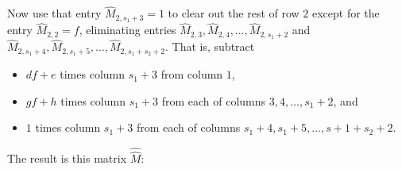 \documentclass[10pt,reqno]{amsart}
\begin{document}
\noindent
Now use that entry $\hat{M}_{2,s_1+3}=1$
to clear out the rest of row $2$ except for the entry $\hat{M}_{2,2}=f$, eliminating entries
$\hat{M}_{2,3},\hat{M}_{2,4},\ldots,\hat{M}_{2,s_1+2}$ and  $\hat{M}_{2,s_1+4},\hat{M}_{2,s_1+5},\ldots,\hat{M}_{2,s_1+s_2+2}$.
That is, subtract 
\begin{itemize}
\item $df+e$ times column $s_1+3$ from column $1$,
\item $gf+h$ times column $s_1+3$ from each of columns $3,4,\ldots,s_1+2$, and
\item $1$ times column $s_1+3$ from each of columns $s_1+4,s_1+5,\ldots,s+1+s_2+2$.
\end{itemize}

\noindent
The result is this matrix $\hat{\hat{M}}$:
\end{document}
